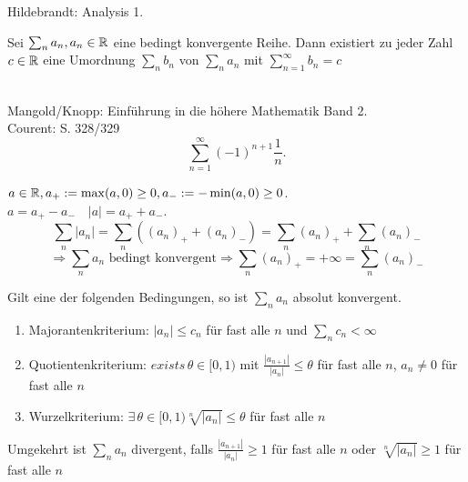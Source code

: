 \documentclass[../ana1.tex]{subfiles}
\begin{document}
\begin{bew}
    Hildebrandt: Analysis 1.
\end{bew}
\begin{satz*}[Riemann]
    Sei \( \sum_n a_n, a_n \in\mathbb{R} \) eine bedingt konvergente Reihe. Dann existiert zu jeder Zahl \( c\in\mathbb{R} \) eine Umordnung \( \sum_n b_n \) von \( \sum_n a_n \) mit \( \sum_{n=1}^\infty b_n = c \)
\end{satz*}
\begin{bspe}\leavevmode \\
    Mangold/Knopp: Einführung in die höhere Mathematik Band 2.\\
    Courent:  S. 328/329
    \[ \sum_{n=1}^\infty {(-1)}^{n+1} \frac{1}{n}. \]
\end{bspe}
\begin{bem}
    \( a\in\mathbb{R}, a_+ := \max(a,0) \geq 0, a_- := -\min(a,0)\geq 0 \).\\
    \( a = a_+ - a_- \quad |a| = a_+ + a_- \).
    \[ \sum_n |a_n| = \sum_n \left( {(a_n)}_+ + {(a_n)}_- \right) = \sum_n {(a_n)}_+ + \sum_n {(a_n)}_- \]
    \[ \Rightarrow \sum_n a_n \text{ bedingt konvergent} \Rightarrow \sum_n {(a_n)}_+ = +\infty = \sum_n {(a_n)}_- \]
\end{bem}
\begin{satz}
    Gilt eine der folgenden Bedingungen, so ist \( \sum_n a_n \) absolut konvergent.
    \begin{enumerate}
        \item Majorantenkriterium: \( |a_n| \leq c_n \) für fast alle \(n\) und \( \sum_n c_n < \infty \)
        \item Quotientenkriterium: \( exists\, \theta \in [0,1) \) mit \( \frac{|a_{n+1}|}{|a_n|} \leq \theta \) für fast alle \(n\), \(a_n \neq 0\) für fast alle \(n\)
        \item Wurzelkriterium: \( \exists \, \theta \in [0,1) \sqrt[n]{|a_n|} \leq \theta \) für fast alle \(n\)
    \end{enumerate}
    Umgekehrt ist \( \sum_n a_n \) divergent, falls \( \frac{|a_{n+1}|}{|a_n|} \geq 1 \) für fast alle \(n\) oder \( \sqrt[n]{|a_n|} \geq 1 \) für fast alle \(n\)
\end{satz}
\end{document}
